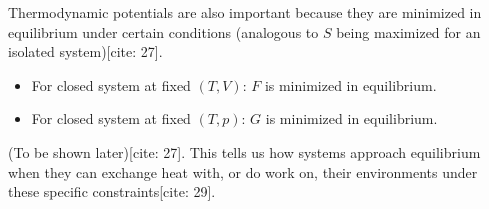 \documentclass[11pt]{article}
\begin{document}
Thermodynamic potentials are also important because they are minimized in equilibrium under certain conditions (analogous to $S$ being maximized for an isolated system)[cite: 27].
\begin{itemize}
    \item For closed system at fixed $(T,V)$: $F$ is minimized in equilibrium.
    \item For closed system at fixed $(T,p)$: $G$ is minimized in equilibrium.
\end{itemize}
(To be shown later)[cite: 27]. This tells us how systems approach equilibrium when they can exchange heat with, or do work on, their environments under these specific constraints[cite: 29].
\end{document}
